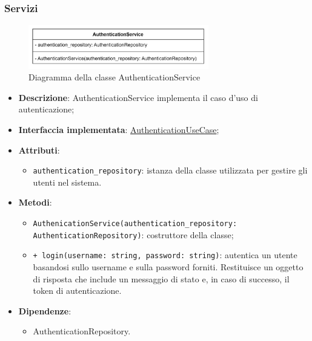\subsubsection{Servizi}

 \label{AuthenticationService}
\begin{figure}[H]
    \centering
    \includegraphics[width=0.7\textwidth]{assets/Backend/authentication_service.png}
    \caption{Diagramma della classe AuthenticationService}
  \end{figure}
\begin{itemize}
    \item \textbf{Descrizione}: AuthenticationService implementa il caso d'uso di autenticazione;
    \item \textbf{Interfaccia implementata}: \hyperref[AuthenticationUseCase]{AuthenticationUseCase};
    \item \textbf{Attributi}:
    \begin{itemize}
        \item \texttt{authentication\_repository}: istanza della classe utilizzata per gestire gli utenti nel sistema.
    \end{itemize}
    \item \textbf{Metodi}: 
    \begin{itemize}
        \item \texttt{AuthenicationService(authentication\_repository: AuthenticationRepository)}: costruttore della classe;
        \item \texttt{+ login(username: string, password: string)}: autentica un utente basandosi sullo username e sulla password forniti. Restituisce un oggetto di risposta che include un messaggio di stato e, in caso di successo, il token di autenticazione.
    \end{itemize}
    \item \textbf{Dipendenze}:
    \begin{itemize}
        \item AuthenticationRepository.
    \end{itemize}
\end{itemize}  

